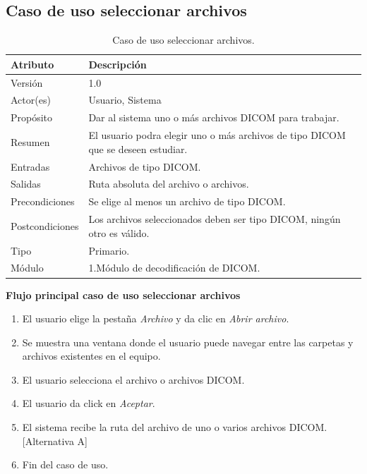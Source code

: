\documentclass[12pt]{report}
\begin{document}
\subsection{Caso de uso seleccionar archivos}
\begin{table}[H]
\begin{center}
\begin{tabular}{|p{25mm}|p{60mm}|}
\hline
Atributo & Descripción\\
\hline \hline 
Versión & 1.0\\
\hline
Actor(es) & Usuario, Sistema\\
\hline
Propósito & Dar al sistema uno o más archivos DICOM para trabajar.\\
\hline
Resumen & El usuario podra elegir uno o más archivos de tipo DICOM que se deseen estudiar.\\
\hline
Entradas & Archivos de tipo DICOM.\\
\hline
Salidas & Ruta absoluta del archivo o archivos.\\
\hline
Precondiciones & Se elige al menos un archivo de tipo DICOM.\\
\hline
Postcondiciones & Los archivos seleccionados deben ser tipo DICOM, ningún otro es válido.\\
\hline
Tipo & Primario.\\
\hline 
Módulo & 1.Módulo de decodificación de DICOM.\\
\hline
\end{tabular}
\caption{Caso de uso seleccionar archivos.}
\end{center}
\end{table}

\textbf{Flujo principal caso de uso seleccionar archivos}
\begin{enumerate}
\item El usuario elige la pestaña \textit{Archivo} y da clic en \textit{Abrir archivo}.
\item Se muestra una ventana donde el usuario puede navegar entre las carpetas y archivos existentes en el equipo.
\item El usuario selecciona el archivo o archivos DICOM.
\item El usuario da click en \textit{Aceptar}.
\item El sistema recibe la ruta del archivo de uno o varios archivos DICOM.[Alternativa A]
\item Fin del caso de uso.
\end{enumerate}
\end{document}
